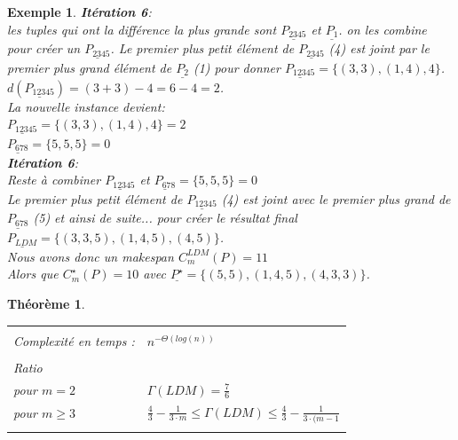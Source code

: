 \documentclass[a4paper,12pt]{report}
\theoremstyle{plain}				%
\newtheorem{theoreme}{Théorème}	%
\newtheorem{example}{Exemple}
\theoremstyle{definition}				%
\begin{document}
\begin{itemize}
\begin{example}
\textbf{Itération 6}:\\
les tuples qui ont la différence la plus grande sont
$\underline{P_{2345}}$  et $\underline{P_{1}}$.
on les combine pour créer un $\underline{P_{2345}}$. Le premier plus petit élément de $\underline{P_{2345}}$ (4) est joint par le premier plus grand élément de $\underline{P_{2}}$ (1) pour donner  $\underline{P_{12345}} = \{(3,3),(1,4),4\}$.
$d(\underline{P_{12345}}) = (3+3)-4 = 6-4=2$.\\
La nouvelle instance devient:\\
$\underline{P_{12345}} = \{(3,3),(1,4),4\}=2$\\
$\underline{P_{678}} = \{5,5,5\}=0$\\

\textbf{Itération 6}:\\
Reste à combiner $\underline{P_{12345}}$ et $\underline{P_{678}} = \{5,5,5\}=0$\\
Le premier plus petit élément de $\underline{P_{12345}}$ (4) est joint avec le premier plus grand de  $\underline{P_{678}}$ (5) et ainsi de suite... pour créer le résultat final \\
$\underline{P_{LDM}}= \{(3,3,5),(1,4,5),(4,5)\}$.\\

Nous avons donc un makespan $C_m^{LDM}(P) = 11 $ \\
Alors que $C_m^{\star}(P) = 10$ avec $\underline{P^{\star}}= \{(5,5),(1,4,5),(4,3,3)\}$.
\end{example}

\end{itemize}



\begin{theoreme}
\begin{flushleft}
\begin{tabular}{|p{8cm}p{6cm}|}
\hline
& \\
Complexité en temps \cite{michiels2003performance}:& $n^{- \Theta (log(n))}$
\\	%
& \\
Ratio \cite{michiels2003performance} &\\
pour $m=2$						& $\Gamma(LDM) = \frac{7}{6}$\\
pour $m\geq 3$					& $ \frac{4}{3}-\frac{1}{3 \cdot m} \leq
   									\Gamma(LDM) 						\leq
   									\frac{4}{3}-\frac{1}{3 \cdot (m-1}$
\\
& \\
\hline
\end{tabular}
\end{flushleft}

\end{theoreme}
\end{document}
